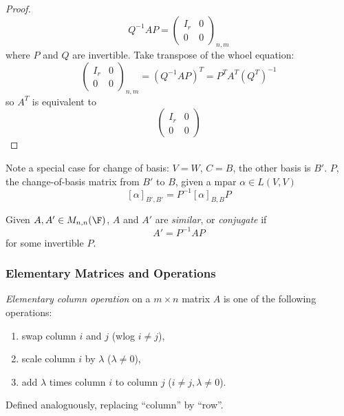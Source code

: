 \documentclass[a4paper]{article}
\theoremstyle{definition}
\begin{document}
\begin{proof}
  \[
    Q^{-1}AP =
    \begin{pmatrix}
      I_r & 0 \\
      0 & 0
    \end{pmatrix}_{n,m}
  \]
  where \(P\) and \(Q\) are invertible. Take transpose of the whoel equation:
  \[
    \begin{pmatrix}
      I_r & 0 \\
      0 & 0
    \end{pmatrix}_{n,m}
    =(Q^{-1}AP)^T = P^TA^T(Q^T)^{-1}
  \]
  so \(A^T\) is equivalent to
  \[
      \begin{pmatrix}
      I_r & 0 \\
      0 & 0
    \end{pmatrix}
  \]
\end{proof}

Note a special case for change of basis: \(V=W\), \(C=B\), the other basis is \(B'\). \(P\), the change-of-basis matrix from \(B'\) to \(B\), given a mpar \(\alpha \in L(V,V)\)
\[
  [\alpha]_{B',B'} = P^{-1}[\alpha]_{B,B}P
\]

\begin{defi}
  Given \(A, A' \in M_{n,n}(\F)\), \(A\) and \(A'\) are \emph{similar}, or \emph{conjugate} if
  \[
    A' = P^{-1}AP
  \]
  for some invertible \(P\).
\end{defi}

\subsubsection{Elementary Matrices and Operations}

\begin{defi}
  \emph{Elementary column operation} on a \(m\times n\) matrix \(A\) is one of the following operations:
  \begin{enumerate}
  \item swap column \(i\) and \(j\) (wlog \(i\neq j\)),
  \item scale column \(i\) by \(\lambda\)  (\(\lambda\neq0\)),
  \item add \(\lambda\) times column \(i\) to column \(j\) (\(i\neq j,\lambda\neq 0\)).
  \end{enumerate}
\end{defi}

\begin{defi}
  Defined analoguously, replacing ``column'' by ``row''.
\end{defi}
\end{document}
